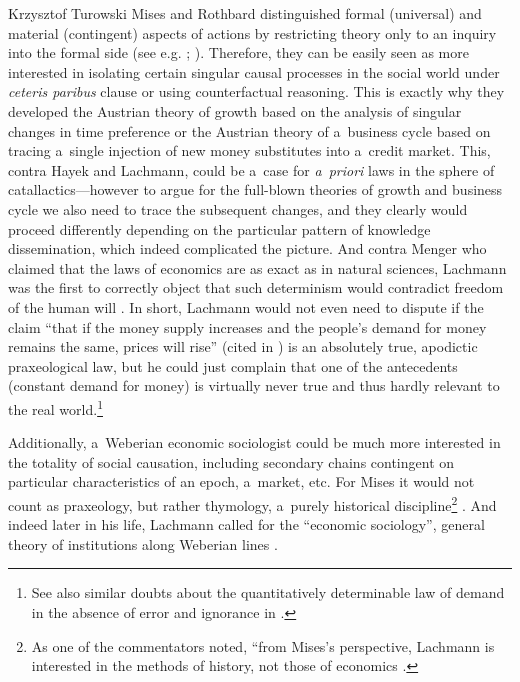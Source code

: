 \begin{artengenv}{Krzysztof Turowski}
Mises and Rothbard distinguished formal (universal) and material (contingent) aspects of actions by restricting theory only to an inquiry into the formal side (see e.g. \cite[31--32]{mises-ha}; \cite[83]{rothbard-mes}). Therefore, they can be easily seen as more interested in isolating certain singular causal processes in the social world under \emph{ceteris paribus} clause or using counterfactual reasoning. This is exactly why they developed the Austrian theory of growth based on the analysis of singular changes in time preference or the Austrian theory of a~business cycle based on tracing a~single injection of new money substitutes into a~credit market.
This, contra Hayek and Lachmann, could be a~case for \emph{a~priori} laws in the sphere of catallactics---however to argue for the full-blown theories of growth and business cycle we also need to trace the subsequent changes, and they clearly would proceed differently depending on the particular pattern of knowledge dissemination, which indeed complicated the picture.
And contra Menger who claimed that the laws of economics are as exact as in natural sciences, Lachmann was the first to correctly object that such determinism would contradict freedom of the human will \parencite[59]{lachmann-menger}.
In short, Lachmann would not even need to dispute if the claim ``that if the money supply increases and the people's demand for money remains the same, prices will rise'' (cited in \cite[52]{rothbard-present}) is an absolutely true, apodictic praxeological law, but he could just complain that one of the antecedents (constant demand for money) is virtually never true and thus hardly relevant to the real world.\footnote{See also similar doubts about the quantitatively determinable law of demand in the absence of error and ignorance in \textcite[58]{lachmann-menger}.}

Additionally, a~Weberian economic sociologist could be much more interested in the totality of social causation, including secondary chains contingent on particular characteristics of an epoch, a~market, etc. For Mises it would not count as praxeology, but rather thymology, a~purely historical discipline\footnote{As one of the commentators noted, ``from Mises's perspective, Lachmann is interested in the methods of history, not those of economics \parencite[37]{parsons}.} \parencite[272--274]{mises-theory}.
And indeed later in his life, Lachmann called for the ``economic sociology'', general theory of institutions along Weberian lines \parencite[277--278,282]{lachmann-hermeneutic}.


\end{artengenv}
